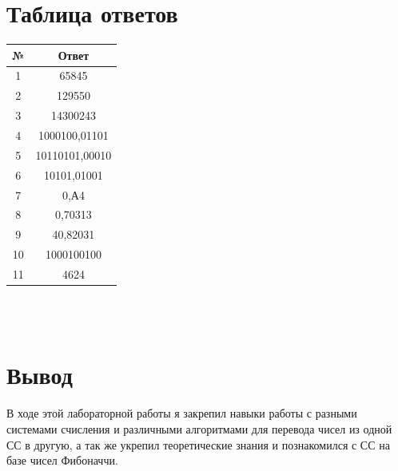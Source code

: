 \documentclass[11pt]{article}
\begin{document}
\section{Таблица ответов}
\large
\begin{tabular}{|c|c|}
\hline
№ & Ответ\\
\hline
1 & 65845\\
\hline
2 & 129550\\
\hline
3 & 14300243\\
\hline
4 & 1000100,01101\\
\hline
5 & 10110101,00010\\
\hline
6 & 10101,01001\\
\hline
7 & 0,А4\\
\hline
8 & 0,70313\\
\hline
9 & 40,82031\\
\hline
10 & 1000100100\\
\hline
11 & 4624\\
\hline
\end{tabular}
\\\\
\section{Вывод}
В ходе этой лабораторной работы я закрепил навыки работы с разными системами счисления и различными алгоритмами
для перевода чисел из одной СС в другую, а так же укрепил теоретические знания и познакомился с СС на базе чисел Фибоначчи.
\end{document}
